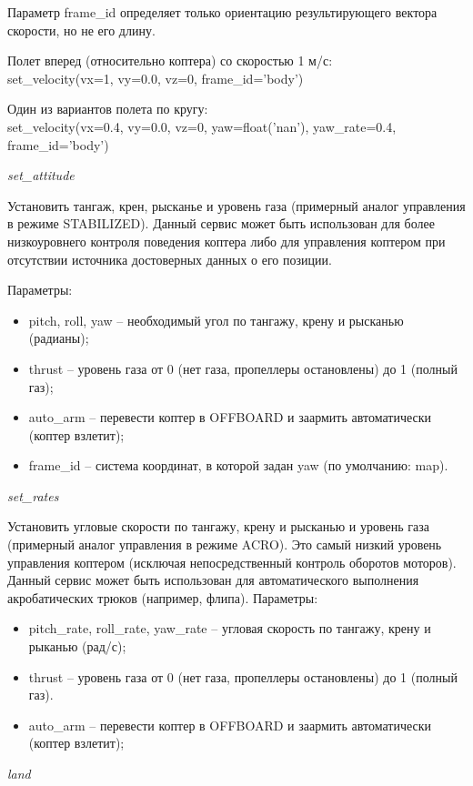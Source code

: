 Параметр frame\_id определяет только ориентацию результирующего вектора скорости, но не его длину.

Полет вперед (относительно коптера) со скоростью 1 м/с:\\
set\_velocity(vx=1, vy=0.0, vz=0, frame\_id='body')

Один из вариантов полета по кругу:\\
set\_velocity(vx=0.4, vy=0.0, vz=0, yaw=float('nan'), yaw\_rate=0.4, frame\_id='body')

\textit{set\_attitude}

Установить тангаж, крен, рысканье и уровень газа (примерный аналог управления в режиме STABILIZED). Данный сервис может быть использован для более низкоуровнего контроля поведения коптера либо для управления коптером при отсутствии источника достоверных данных о его позиции.

Параметры:
\begin{itemize}
    \item pitch, roll, yaw – необходимый угол по тангажу, крену и рысканью (радианы);
    \item thrust – уровень газа от 0 (нет газа, пропеллеры остановлены) до 1 (полный газ);
    \item auto\_arm – перевести коптер в OFFBOARD и заармить автоматически (коптер взлетит);
    \item frame\_id – система координат, в которой задан yaw (по умолчанию: map).
\end{itemize}

\textit{set\_rates}

Установить угловые скорости по тангажу, крену и рысканью и уровень газа (примерный аналог управления в режиме ACRO). Это самый низкий уровень управления коптером (исключая непосредственный контроль оборотов моторов). Данный сервис может быть использован для автоматического выполнения акробатических трюков (например, флипа).
Параметры:
\begin{itemize}
    \item pitch\_rate, roll\_rate, yaw\_rate – угловая скорость по тангажу, крену и рыканью (рад/с);
    \item thrust – уровень газа от 0 (нет газа, пропеллеры остановлены) до 1 (полный газ).
    \item auto\_arm – перевести коптер в OFFBOARD и заармить автоматически (коптер взлетит);
\end{itemize}

\textit{land}

